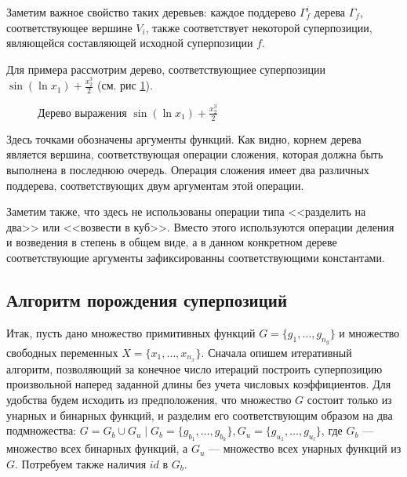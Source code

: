 \documentclass[12pt,a4paper]{amsart}
\begin{document}
Заметим важное свойство таких деревьев: каждое поддерево $\Gamma_f^i$
дерева $\Gamma_f$, соответствующее вершине $V_i$, также соответствует
некоторой суперпозиции, являющейся составляющей исходной суперпозиции $f$.

Для примера рассмотрим дерево, соответствующиее суперпозиции
$\sin (\ln x_1) + \frac{x_2^3}{2}$ (см. рис \ref{fig:expr_tree_example}).

\begin{figure}[h]
  \caption{Дерево выражения $\sin (\ln x_1) + \frac{x_2^3}{2}$}
  \label{fig:expr_tree_example}
\end{figure}

Здесь точками обозначены аргументы функций. Как видно, корнем дерева является
вершина, соответствующая операции сложения, которая должна быть выполнена в
последнюю очередь. Операция сложения имеет два различных поддерева, соответствующих
двум аргументам этой операции.

Заметим также, что здесь не использованы операции типа <<разделить на два>> или
<<возвести в куб>>. Вместо этого используются операции деления и возведения в
степень в общем виде, а в данном конкретном дереве соответствующие аргументы
зафиксированны соответствующими константами.

\subsection{Алгоритм порождения суперпозиций}

Итак, пусть дано множество примитивных функций $G = \{ g_1, \dots, g_{n_g} \}$ и
множество свободных переменных $X = \{ x_1, \dots, x_{n_x} \}$. Сначала
опишем итеративный алгоритм, позволяющий за конечное число итераций
построить суперпозицию произвольной наперед заданной длины без учета числовых
коэффициентов. Для удобства будем исходить из предположения, что множество
$G$ состоит только из унарных и бинарных функций, и разделим его
соответствующим образом на два подмножества:
$G = G_b \cup G_u \mid G_b = \{ g_{b_1}, \dots, g_{b_k} \}, G_u = \{ g_{u_1}, \dots, g_{u_l} \}$,
где $G_b$ --- множество всех бинарных функций, а $G_u$ --- множество всех
унарных функций из $G$. Потребуем также наличия $id$ в $G_b$.
\end{document}
